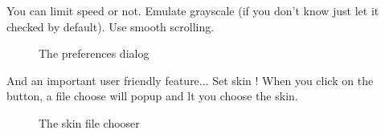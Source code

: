 \documentclass[10pt]{report}
\begin{document}
You can limit speed or not.\newline
Emulate grayscale (if you don't know just let it checked by default).\newline
Use smooth scrolling.\newline
\begin{figure}[H]
\centering
{}
\caption{The preferences dialog}
\end{figure}
And an important user friendly feature...\newline
Set skin !\newline
When you click on the button, a file choose will popup and lt you choose the skin.\newline
\begin{figure}[H]
\centering
{}
\caption{The skin file chooser}
\end{figure}
\end{document}
